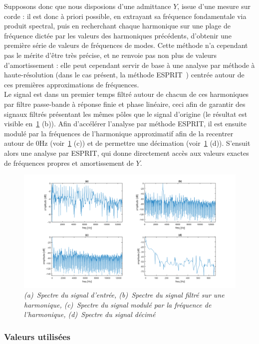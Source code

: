 Supposons donc que nous disposions d'une admittance $Y$, issue d'une mesure sur corde : il est donc à priori possible, en extrayant sa fréquence fondamentale via produit spectral, puis en recherchant chaque harmonique sur une plage de fréquence dictée par les valeurs des harmoniques précédents, d'obtenir une première série de valeurs de fréquences de modes. Cette méthode n'a cependant pas le mérite d'être très précise, et ne renvoie pas non plus de valeurs d'amortissement : elle peut cependant servir de base à une analyse par méthode à haute-résolution (dans le cas présent, la méthode ESPRIT~\cite{badeau2005methodes}) centrée autour de ces premières approximations de fréquences.\\
Le signal est dans un premier temps filtré autour de chacun de ces harmoniques par filtre passe-bande à réponse finie et phase linéaire, ceci afin de garantir des signaux filtrés présentant les mêmes pôles que le signal d'origine (le résultat est visible en~\ref{pre_proc} (b)). Afin d'accélérer l'analyse par méthode ESPRIT, il est ensuite modulé par la fréquences de l'harmonique approximatif afin de la recentrer autour de $\si{0\Hz}$ (voir~\ref{pre_proc} (c)) et de permettre une décimation (voir~\ref{pre_proc} (d)). S'ensuit alors une analyse par ESPRIT, qui donne directement accès aux valeurs exactes de fréquences propres et amortissement de $Y$.

\begin{figure}[hpbt]
\centering
\includegraphics[width=\linewidth]{figures/pre_proc.png}
\caption{\textit{(a)~Spectre du signal d'entrée, (b)~Spectre du signal filtré sur une harmonique, (c)~Spectre du signal modulé par la fréquence de l'harmonique,
(d)~Spectre du signal décimé}}
\label{pre_proc}
\end{figure}

\subsubsection{Valeurs utilisées}


